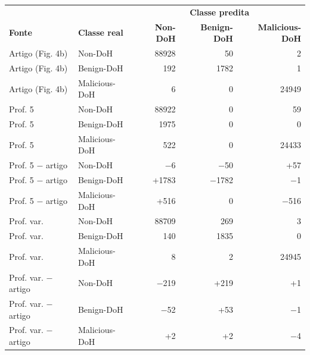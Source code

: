 \begin{tabular}{llrrr}
\hline
\multicolumn{2}{c}{\textbf{}} & \multicolumn{3}{c}{\textbf{Classe predita}} \\
\textbf{Fonte} & \textbf{Classe real} & \textbf{Non-DoH} & \textbf{Benign-DoH} & \textbf{Malicious-DoH} \\ \hline
Artigo (Fig. 4b) & Non-DoH & 88928 & 50 & 2 \\
Artigo (Fig. 4b) & Benign-DoH & 192 & 1782 & 1 \\
Artigo (Fig. 4b) & Malicious-DoH & 6 & 0 & 24949 \\
\hline
Prof. 5 & Non-DoH & 88922 & 0 & 59 \\
Prof. 5 & Benign-DoH & 1975 & 0 & 0 \\
Prof. 5 & Malicious-DoH & 522 & 0 & 24433 \\
Prof. 5 $-$ artigo & Non-DoH & $-$6 & $-$50 & +57 \\
Prof. 5 $-$ artigo & Benign-DoH & +1783 & $-$1782 & $-$1 \\
Prof. 5 $-$ artigo & Malicious-DoH & +516 & 0 & $-$516 \\
\hline
Prof. var. & Non-DoH & 88709 & 269 & 3 \\
Prof. var. & Benign-DoH & 140 & 1835 & 0 \\
Prof. var. & Malicious-DoH & 8 & 2 & 24945 \\
Prof. var. $-$ artigo & Non-DoH & $-$219 & +219 & +1 \\
Prof. var. $-$ artigo & Benign-DoH & $-$52 & +53 & $-$1 \\
Prof. var. $-$ artigo & Malicious-DoH & +2 & +2 & $-$4 \\
\hline
\end{tabular}
